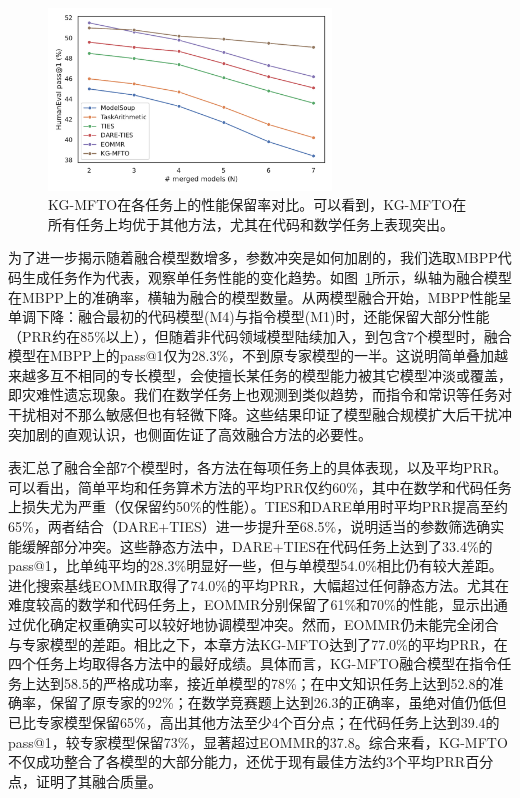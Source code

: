 \documentclass[../main.tex]{subfiles}
\begin{document}
\begin{figure}
	\centering
	\includegraphics[width=0.67\textwidth]{KG-MFTO/figure2_single_task_coding.pdf}
	\caption{KG-MFTO在各任务上的性能保留率对比。可以看到，KG-MFTO在所有任务上均优于其他方法，尤其在代码和数学任务上表现突出。}
	\label{fig:task-wise-prr}
\end{figure}

为了进一步揭示随着融合模型数增多，参数冲突是如何加剧的，我们选取MBPP代码生成任务作为代表，观察单任务性能的变化趋势。如图~\ref{fig:task-wise-prr}所示，纵轴为融合模型在MBPP上的准确率，横轴为融合的模型数量。从两模型融合开始，MBPP性能呈单调下降：融合最初的代码模型(M4)与指令模型(M1)时，还能保留大部分性能（PRR约在85\%以上），但随着非代码领域模型陆续加入，到包含7个模型时，融合模型在MBPP上的pass@1仅为28.3\%，不到原专家模型的一半。这说明简单叠加越来越多互不相同的专长模型，会使擅长某任务的模型能力被其它模型冲淡或覆盖，即灾难性遗忘现象。我们在数学任务上也观测到类似趋势，而指令和常识等任务对干扰相对不那么敏感但也有轻微下降。这些结果印证了模型融合规模扩大后干扰冲突加剧的直观认识，也侧面佐证了高效融合方法的必要性。

表汇总了融合全部7个模型时，各方法在每项任务上的具体表现，以及平均PRR。可以看出，简单平均和任务算术方法的平均PRR仅约60\%，其中在数学和代码任务上损失尤为严重（仅保留约50\%的性能）。TIES和DARE单用时平均PRR提高至约65\%，两者结合（DARE+TIES）进一步提升至68.5\%，说明适当的参数筛选确实能缓解部分冲突。这些静态方法中，DARE+TIES在代码任务上达到了33.4\%的pass@1，比单纯平均的28.3\%明显好一些，但与单模型54.0\%相比仍有较大差距。进化搜索基线EOMMR取得了74.0\%的平均PRR，大幅超过任何静态方法。尤其在难度较高的数学和代码任务上，EOMMR分别保留了61\%和70\%的性能，显示出通过优化确定权重确实可以较好地协调模型冲突。然而，EOMMR仍未能完全闭合与专家模型的差距。相比之下，本章方法KG-MFTO达到了77.0\%的平均PRR，在四个任务上均取得各方法中的最好成绩。具体而言，KG-MFTO融合模型在指令任务上达到58.5的严格成功率，接近单模型的78\%；在中文知识任务上达到52.8的准确率，保留了原专家的92\%；在数学竞赛题上达到26.3的正确率，虽绝对值仍低但已比专家模型保留65\%，高出其他方法至少4个百分点；在代码任务上达到39.4的pass@1，较专家模型保留73\%，显著超过EOMMR的37.8。综合来看，KG-MFTO不仅成功整合了各模型的大部分能力，还优于现有最佳方法约3个平均PRR百分点，证明了其融合质量。
\end{document}

